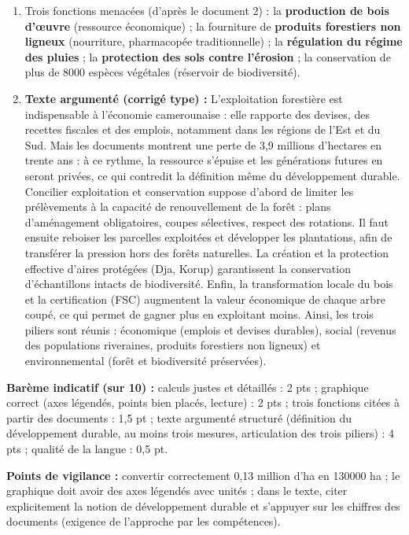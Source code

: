 \documentclass[11pt]{article}
\begin{document}
\begin{corrige}
\begin{enumerate}
On observe une décroissance quasi linéaire : la forêt recule de façon régulière, sans ralentissement visible.
\item Trois fonctions menacées (d'après le document 2) : la \textbf{production de bois d'œuvre} (ressource économique) ; la fourniture de \textbf{produits forestiers non ligneux} (nourriture, pharmacopée traditionnelle) ; la \textbf{régulation du régime des pluies} ; la \textbf{protection des sols contre l'érosion} ; la conservation de plus de \num{8000} espèces végétales (réservoir de biodiversité).
\item \textbf{Texte argumenté (corrigé type) :} L'exploitation forestière est indispensable à l'économie camerounaise : elle rapporte des devises, des recettes fiscales et des emplois, notamment dans les régions de l'Est et du Sud. Mais les documents montrent une perte de 3,9 millions d'hectares en trente ans : à ce rythme, la ressource s'épuise et les générations futures en seront privées, ce qui contredit la définition même du développement durable. Concilier exploitation et conservation suppose d'abord de limiter les prélèvements à la capacité de renouvellement de la forêt : plans d'aménagement obligatoires, coupes sélectives, respect des rotations. Il faut ensuite reboiser les parcelles exploitées et développer les plantations, afin de transférer la pression hors des forêts naturelles. La création et la protection effective d'aires protégées (Dja, Korup) garantissent la conservation d'échantillons intacts de biodiversité. Enfin, la transformation locale du bois et la certification (FSC) augmentent la valeur économique de chaque arbre coupé, ce qui permet de gagner plus en exploitant moins. Ainsi, les trois piliers sont réunis : économique (emplois et devises durables), social (revenus des populations riveraines, produits forestiers non ligneux) et environnemental (forêt et biodiversité préservées).
\end{enumerate}
\textbf{Barème indicatif (sur 10) :} calculs justes et détaillés : 2 pts ; graphique correct (axes légendés, points bien placés, lecture) : 2 pts ; trois fonctions citées à partir des documents : 1,5 pt ; texte argumenté structuré (définition du développement durable, au moins trois mesures, articulation des trois piliers) : 4 pts ; qualité de la langue : 0,5 pt.

\textbf{Points de vigilance :} convertir correctement 0,13 million d'ha en \num{130000} ha ; le graphique doit avoir des axes légendés avec unités ; dans le texte, citer explicitement la notion de développement durable et s'appuyer sur les chiffres des documents (exigence de l'approche par les compétences).
\end{corrige}
\end{document}
